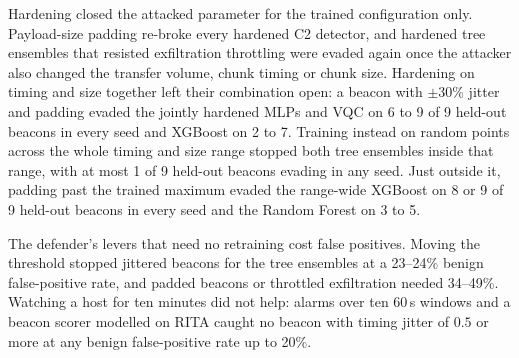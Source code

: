 \documentclass[preprint,12pt]{elsarticle}
\begin{document}
Hardening closed the attacked parameter for the trained configuration only. Payload-size padding
re-broke every hardened C2 detector, and hardened tree ensembles that resisted exfiltration throttling
were evaded again once the attacker also changed the transfer volume, chunk timing or chunk size.
Hardening on timing and size together left their combination open: a beacon with $\pm$30\% jitter and
padding evaded the jointly hardened MLPs and VQC on 6 to 9 of 9 held-out beacons in every seed and
XGBoost on 2 to 7. Training instead on random points across the whole timing and size range stopped
both tree ensembles inside that range, with at most 1 of 9 held-out beacons evading in any seed. Just
outside it, padding past the trained maximum evaded the range-wide XGBoost on 8 or 9 of 9 held-out
beacons in every seed and the Random Forest on 3 to 5.

The defender's levers that need no retraining cost false positives. Moving the threshold stopped
jittered beacons for the tree ensembles at a 23--24\% benign false-positive rate, and padded beacons or
throttled exfiltration needed 34--49\%. Watching a host for ten minutes did not help: alarms over ten
60\,s windows and a beacon scorer modelled on RITA caught no beacon with timing jitter of $0.5$ or
more at any benign false-positive rate up to 20\%.
\end{document}
